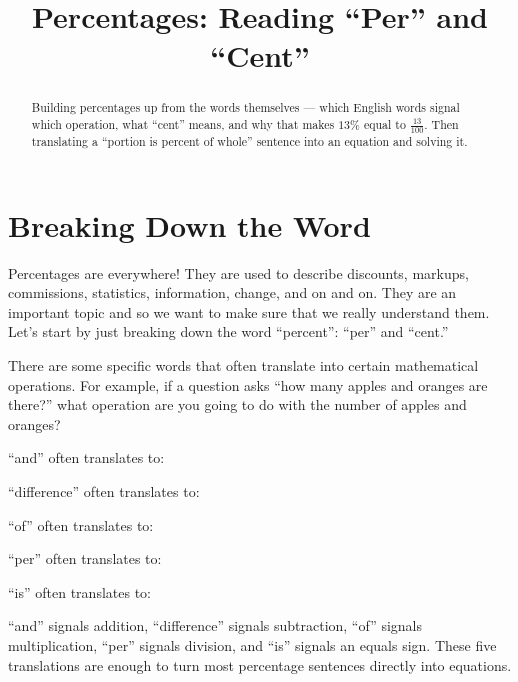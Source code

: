 \documentclass[12pt]{ximera}
\title{Percentages: Reading ``Per'' and ``Cent''}
\begin{document}
\begin{abstract}
Building percentages up from the words themselves --- which English words signal which
operation, what ``cent'' means, and why that makes $13\%$ equal to $\tfrac{13}{100}$.
Then translating a ``portion is percent of whole'' sentence into an equation and
solving it.
\end{abstract}
\maketitle

\section*{Breaking Down the Word}

Percentages are everywhere! They are used to describe discounts, markups, commissions,
statistics, information, change, and on and on. They are an important topic and so we
want to make sure that we really understand them. Let's start by just breaking down the
word ``percent'': ``per'' and ``cent.''

There are some specific words that often translate into certain mathematical
operations. For example, if a question asks ``how many apples and oranges are there?''
what operation are you going to do with the number of apples and oranges?

\begin{problem}
``and'' often translates to:
\begin{multipleChoice}
\end{multipleChoice}

``difference'' often translates to:
\begin{multipleChoice}
\end{multipleChoice}

``of'' often translates to:
\begin{multipleChoice}
\end{multipleChoice}

``per'' often translates to:
\begin{multipleChoice}
\end{multipleChoice}

``is'' often translates to:
\begin{multipleChoice}
\end{multipleChoice}

\begin{solution}
``and'' signals addition, ``difference'' signals subtraction, ``of'' signals
multiplication, ``per'' signals division, and ``is'' signals an equals sign. These five
translations are enough to turn most percentage sentences directly into equations.
\end{solution}
\end{problem}
\end{document}
